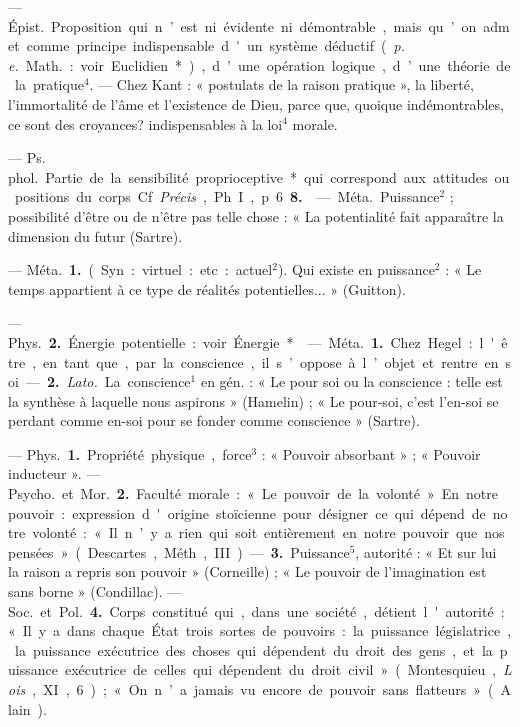 \begin{itemize}[leftmargin=1cm, label=, itemsep=1pt]
 — \si{Épist.} Proposition qui
n’est ni évidente ni démontrable,
mais qu’on admet comme principe
indispensable d'un système déductif
({\it p. e.} \si{Math.} : voir Euclidien*), d’une
opération logique, d’une théorie de
la pratique$^4$. — Chez Kant : « postulats de la raison pratique », la liberté, l’immortalité de l'âme et
l’existence de Dieu, parce que,
quoique indémontrables, ce sont des
croyances? indispensables à la loi$^4$
morale.

 — \si{Ps. phol.}
Partie de la sensibilité proprioceptive* qui correspond aux attitudes
ou positions du corps. Cf {\it Précis},
Ph. I, p. 6 {\bf 8.}

 — \si{Méta.} Puissance$^2$ ; possibilité d’être ou de n'être pas telle
chose : « La potentialité fait apparaître la dimension du futur
(Sartre).

 — \si{Méta.} {\bf 1.} (Syn. : virtuel:
etc. : actuel$^2$). Qui existe en puissance$^2$ : « Le temps appartient à ce
type de réalités potentielles... »
(Guitton).

— \si{Phys.} {\bf 2.} Énergie potentielle :
voir Énergie*.

 — \si{Méta.} {\bf 1.} Chez Hegel : l'être,
en tant que, par la conscience, il
s’oppose à l’objet et rentre en soi. —
 {\bf 2.} {\it Lato.} La conscience$^1$ en gén. : « Le
pour soi ou la conscience : telle est
la synthèse à laquelle nous aspirons » (Hamelin) ; « Le pour-soi, c’est
l’en-soi se perdant comme en-soi
pour se fonder comme conscience »
(Sartre).

 — \si{Phys.} {\bf 1.} Propriété physique, force$^3$ : « Pouvoir absorbant » ;
« Pouvoir inducteur ». — \si{Psycho.} et
\si{Mor.} {\bf 2.} Faculté morale : « Le pouvoir de la volonté ». En notre pouvoir : expression d'origine stoïcienne
pour désigner ce qui
dépend de notre volonté : « Il n’y a
rien qui soit entièrement en notre
pouvoir que nos pensées » (Descartes,
Méth., III). — {\bf 3.} Puissance$^5$, autorité : « Et sur lui la raison a repris
son pouvoir » (Corneille) ; « Le pouvoir de l'imagination est sans
borne » (Condillac). — \si{Soc.} et \si{Pol.}
 {\bf 4.} Corps constitué qui, dans une
société, détient l'autorité : « Il y a
dans chaque État trois sortes de
pouvoirs : la puissance législatrice,
la puissance exécutrice des choses
qui dépendent du droit des gens, et
la puissance exécutrice de celles qui
dépendent du droit civil » (Montesquieu, {\it Lois}, XI, 6) ; « On n’a jamais
vu encore de pouvoir sans flatteurs »
(Alain).


\end{itemize}
